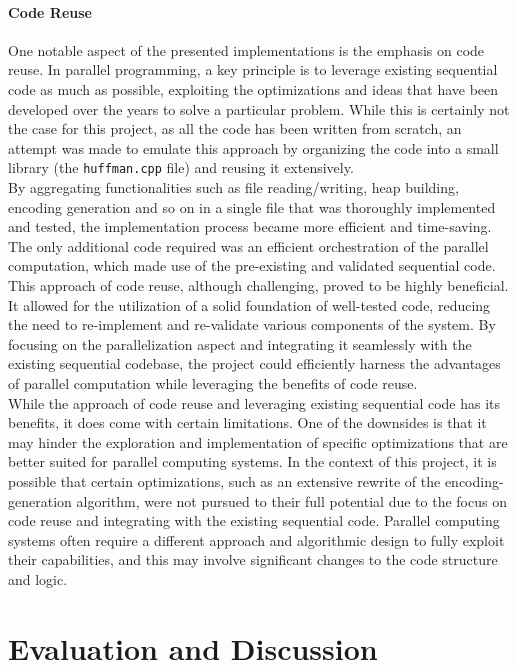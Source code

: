 \documentclass[10pt]{article}
\begin{document}
\paragraph{Code Reuse} One notable aspect of the presented implementations is the emphasis on code reuse. In parallel programming, a key principle is to leverage existing sequential code as much as possible, exploiting the optimizations and ideas that have been developed over the years to solve a particular problem. While this is certainly not the case for this project, as all the code has been written from scratch, an attempt was made to emulate this approach by organizing the code into a small library (the \texttt{huffman.cpp} file) and reusing it extensively.\\
By aggregating functionalities such as file reading/writing, heap building, encoding generation and so on in a single file that was thoroughly implemented and tested, the implementation process became more efficient and time-saving. The only additional code required was an efficient orchestration of the parallel computation, which made use of the pre-existing and validated sequential code.\\
This approach of code reuse, although challenging, proved to be highly beneficial. It allowed for the utilization of a solid foundation of well-tested code, reducing the need to re-implement and re-validate various components of the system. By focusing on the parallelization aspect and integrating it seamlessly with the existing sequential codebase, the project could efficiently harness the advantages of parallel computation while leveraging the benefits of code reuse.\\
While the approach of code reuse and leveraging existing sequential code has its benefits, it does come with certain limitations. One of the downsides is that it may hinder the exploration and implementation of specific optimizations that are better suited for parallel computing systems. In the context of this project, it is possible that certain optimizations, such as an extensive rewrite of the encoding-generation algorithm, were not pursued to their full potential due to the focus on code reuse and integrating with the existing sequential code. Parallel computing systems often require a different approach and algorithmic design to fully exploit their capabilities, and this may involve significant changes to the code structure and logic.

\section{Evaluation and Discussion}
\end{document}
